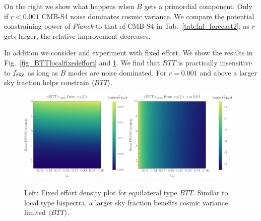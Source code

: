 On the right we show what happens when $B$ gets a primordial component. Only if $r < 0.001$  CMB-S4 noise dominates cosmic variance. We compare the potential constraining power of {\it Planck} to that of CMB-S4 in Tab.~\ref{tab:fnl_forecast2}; as $r$ gets larger, the relative improvement decreases. 

In addition we consider and experiment with fixed effort. We show the results in Fig.~\ref{fig_BTTlocalfixedeffort} and \ref{fig_BTTequilfixedeffort}. We find that $BTT$ is practically insensitive to $f_{\rm sky}$ as long as $B$ modes are noise dominated. For $r = 0.001$ and above a larger sky fraction helps constrain $\langle BTT \rangle$. 

\begin{figure}[htbp!]
\centering
\includegraphics[width=0.48\textwidth]{Inflation/FixedEffortBTTequil}
\includegraphics[width=0.48\textwidth]{Inflation/FixedEffortBTTequilr}
\caption{Left: Fixed effort density plot for equilateral type $BTT$. Similar to local type bispectra, a larger sky fraction benefits cosmic variance limited $\langle BTT\rangle$. }
\label{fig_BTTequilfixedeffort}
\end{figure}
